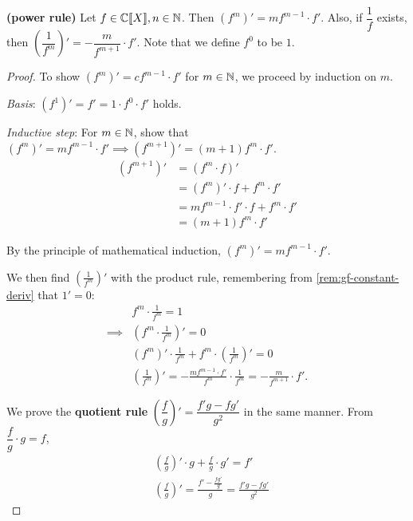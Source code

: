 \documentclass[a4paper, 12pt]{report}
\begin{document}
\begin{lem}\label{lem:gf-power-rule}
\textbf{(power rule)} Let $f \in \mathbb{C}\llbracket X \rrbracket, n \in \mathbb{N}$. Then $(f^m)'  = m f^{m - 1} \cdot f'$. Also, if $\dfrac{1}{f}$ exists, then $\left(\dfrac{1}{f^m}\right)' = -\dfrac{m}{f^{m + 1}} \cdot f'$. Note that we define $f^0$ to be $1$.
\end{lem}
\begin{proof}
To show $(f^m)' = c f^{m - 1} \cdot f'$ for $m \in \mathbb{N}$, we proceed by induction on $m$.
\begin{description}
\item \textit{Basis}: $(f^1)' = f' = 1 \cdot f^0 \cdot f'$ holds.
\item \textit{Inductive step}: For $m \in \mathbb{N}$, show that $(f^m)' = m f^{m - 1} \cdot f' \implies (f^{m + 1})' = (m + 1) f^m \cdot f'$.
\begin{align*}
    (f^{m + 1})'
    &= (f^m \cdot f)'\\
    &= (f^m)' \cdot f + f^m \cdot f'\\
    &= m f^{m - 1} \cdot f' \cdot f + f^m \cdot f'\\
    &= (m + 1) f^m \cdot f'
\end{align*}
\item By the principle of mathematical induction, $(f^m)' = m f^{m - 1} \cdot f'$.
\end{description}

We then find $(\frac{1}{f^m})'$ with the product rule, remembering from \cref{rem:gf-constant-deriv} that $1' = 0$:
\begin{align*}
    &f^m \cdot \frac{1}{f^m} = 1\\
    \implies &(f^m \cdot \frac{1}{f^m})' = 0\\
    &(f^m)' \cdot \frac{1}{f^m} + f^m \cdot \left(\frac{1}{f^m}\right)' = 0\\
    &\left(\frac{1}{f^m}\right)'= -\frac{m f^{m - 1} \cdot f'}{f^m} \cdot \frac{1}{f^m} = -\frac{m}{f^{m + 1}} \cdot f'.
\end{align*}

We prove the \textbf{quotient rule} $\left(\dfrac{f}{g}\right)' = \dfrac{f' g - f g'}{g^2}$ in the same manner. From $\dfrac{f}{g} \cdot g = f$,
\begin{align*}
    &\left(\frac{f}{g}\right)' \cdot g + \frac{f}{g} \cdot g' = f'\\
    &\left(\frac{f}{g}\right)' = \frac{f' - \frac{f g'}{g}}{g} = \frac{f' g - f g'}{g^2}
\end{align*}
\end{proof}
\end{document}
